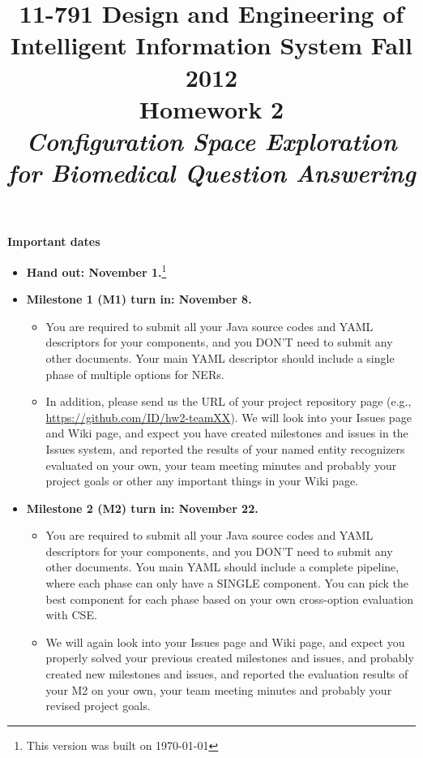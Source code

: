 \documentclass[oneside]{memoir}
\title{{\bfseries 11-791 Design and Engineering of Intelligent Information
System Fall 2012\\Homework 2}\\
\vspace{1em}
\itshape\rmfamily Configuration Space Exploration for Biomedical Question
Answering}
\date{}
\begin{document}
\begin{titlingpage}
\maketitle

\hspace{-0.1\textwidth}
\begin{minipage}{1.2\textwidth}
\vspace{-5em}
\textbf{Important dates}
\begin{itemize}

\item \textbf{Hand out: November 1.}\footnote{This version was built on \today}

\item \textbf{Milestone 1 (M1) turn in: November 8.}

\begin{itemize}

\item You are required to submit all your Java source codes and YAML descriptors
for your components, and you DON'T need to submit any other documents. Your main
YAML descriptor should include a single phase of multiple options for NERs.

\item In addition, please send us the URL of your project repository page (e.g.,
\url{https://github.com/ID/hw2-teamXX}). We will look into your Issues page and
Wiki page, and expect you have created milestones and issues in the Issues
system, and reported the results of your named entity recognizers evaluated on
your own, your team meeting minutes and probably your project goals or other any
important things in your Wiki page.

\end{itemize}

\item \textbf{Milestone 2 (M2) turn in: November 22.}

\begin{itemize}

\item You are required to submit all your Java source codes and YAML descriptors
for your components, and you DON'T need to submit any other documents. You main
YAML should include a complete pipeline, where each phase can only have a SINGLE
component. You can pick the best component for each phase based on your own
cross-option evaluation with CSE.

\item We will again look into your Issues page and Wiki page, and expect you
properly solved your previous created milestones and issues, and probably
created new milestones and issues, and reported the evaluation results of your
M2 on your own, your team meeting minutes and probably your revised project
goals.


\end{itemize}
\end{itemize}
\end{minipage}
\end{titlingpage}
\end{document}
